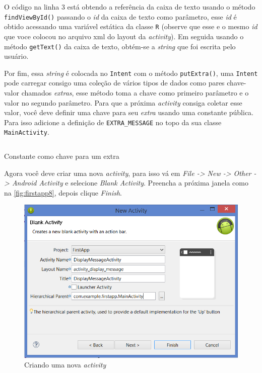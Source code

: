 \documentclass[a4paper,12pt,brazil,oneside]{book}
\begin{document}
\begin{singlespace}
O código na linha 3 está obtendo a referência da caixa de texto usando o método \\ \texttt{findViewById()} passando o \textit{id} da caixa de texto como parâmetro, esse \emph{id} é obtido acessando uma variável estática da classe \texttt{R}  (observe que esse e o mesmo \emph{id} que voce colocou no arquivo xml do layout da \emph{activity}).
Em seguida usando o método \texttt{getText()} da caixa de texto, obtém-se a \emph{string} que foi escrita pelo usuário.

Por fim, essa \emph{string} é colocada no \texttt{Intent} com o método \texttt{putExtra()}, uma \texttt{Intent} pode carregar consigo uma coleção de vários tipos de dados como pares chave-valor chamados \textit{extras}, esse método toma a chave como primeiro parâmetro e o valor no segundo parâmetro.
Para que a próxima \emph{activity} consiga coletar esse valor, você deve definir uma chave para seu \textit{extra} usando uma constante pública. Para isso adicione a definição de \texttt{EXTRA\_MESSAGE} no topo da sua classe \texttt{MainActivity}.

\begin{listing}[H]
\inputminted[linenos=true,fontsize=\small,frame=lines, framesep=2mm, tabsize=2,numbersep=5pt]{java}{src/firstapp/7.java}
\caption{Constante como chave para um extra}
\end{listing}

Agora você deve criar uma nova \emph{activity}, para isso vá em \textit{File -> New -> Other -> Android Activity} e selecione \textit{Blank Activity}. Preencha a próxima janela como na \autoref{fig:firstapp8}, depois clique \textit{Finish}. 

\begin{figure}[H]
  \centering
  \includegraphics[width=.75\textwidth]{figuras/firstapp/firstapp8.png}
  \caption{Criando uma nova \emph{activity}}
  \label{fig:firstapp8}
\end{figure}


\end{singlespace}
\end{document}
